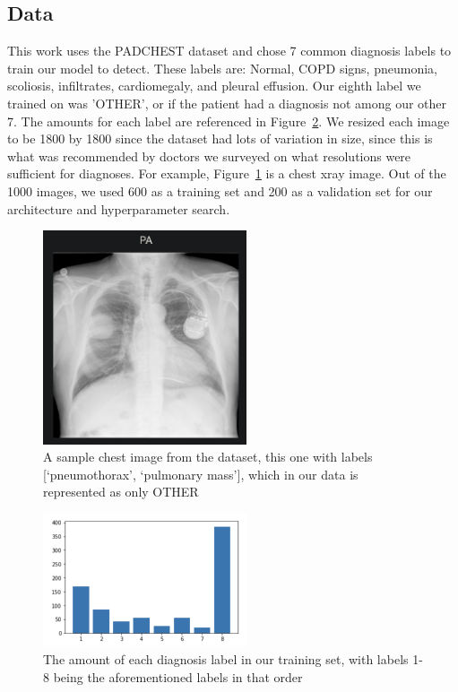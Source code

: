 \documentclass[10pt,twocolumn,letterpaper]{article}
\begin{document}
\subsection{Data}
This work uses the PADCHEST\cite{padchest} dataset and chose 7 common diagnosis labels to train our model to detect. 
These labels are: Normal, COPD signs, pneumonia, scoliosis, infiltrates, cardiomegaly, and pleural effusion. 
Our eighth label we trained on was 'OTHER', or if the patient had a diagnosis not among our other 7. The amounts for each label are referenced in Figure~\ref{fig:bar}.
We resized each image to be 1800 by 1800 since the dataset had lots of variation in size, since this is what was recommended by doctors we surveyed on what resolutions were sufficient for diagnoses. For example, Figure~\ref{fig:paimg1} is a chest xray image.
Out of the 1000 images, we used 600 as a training set and 200 as a validation set for our architecture and hyperparameter search. 
\begin{figure}[!htb]
    \centering

    \includegraphics[width=6cm]{latex/figs/paimg2.png}
    \caption{A sample chest image from the dataset, this one with labels [‘pneumothorax’, ‘pulmonary mass’], which in our data is represented as only OTHER}
    \label{fig:paimg1}
\end{figure}
\begin{figure}[!htb]
    \centering

    \includegraphics[width=6cm]{latex/figs/bar.png}
    \caption{The amount of each diagnosis label in our training set, with labels 1-8 being the aforementioned labels in that order}
    \label{fig:bar}
\end{figure}
\end{document}
